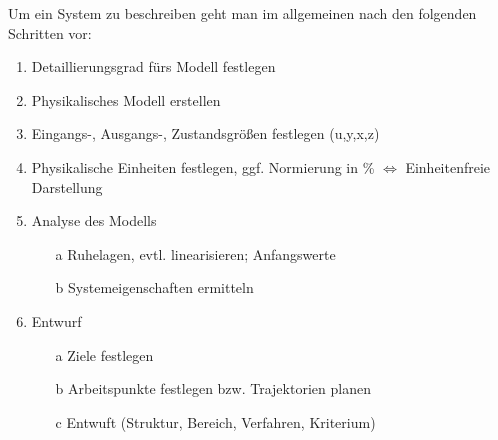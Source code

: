 Um ein System zu beschreiben geht man im allgemeinen nach den folgenden Schritten vor:
\begin{enumerate}
    \item Detaillierungsgrad fürs Modell festlegen
    \item Physikalisches Modell erstellen
    \item Eingangs-, Ausgangs-, Zustandsgrößen festlegen (u,y,x,z)
    \item Physikalische Einheiten festlegen, ggf. Normierung in \% $\Longleftrightarrow$ Einheitenfreie Darstellung
    \item Analyse des Modells
    \begin{itemize}
        \item [a] Ruhelagen, evtl. linearisieren; Anfangswerte
        \item [b] Systemeigenschaften ermitteln
    \end{itemize}
    \item Entwurf
    \begin{itemize}
        \item [a] Ziele festlegen
        \item [b] Arbeitspunkte festlegen bzw. Trajektorien planen
        \item [c] Entwuft (Struktur, Bereich, Verfahren, Kriterium)
        \end{itemize}
\end{enumerate}